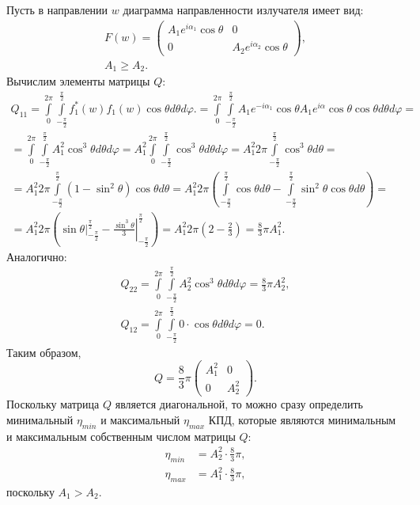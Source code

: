 Пусть в направлении $w$ диаграмма направленности излучателя имеет вид:
\begin{gather*}
    F(w)
    = \begin{pmatrix}
          A_1 e^{i \alpha_1} \cos \theta & 0                              \\
          0                              & A_2 e^{i \alpha_2} \cos \theta
    \end{pmatrix} , \\
    A_1 \ge A_2.
\end{gather*}
Вычислим элементы матрицы $Q$:
\begin{multline*}
    Q_{11}
    = \int \limits_0^{2 \pi} \int \limits_{-\frac{\pi}{2}}^\frac{\pi}{2} f_1^*(w) f_1(w) \cos \theta d\theta d\varphi .
    = \int \limits_0^{2 \pi} \int \limits_{-\frac{\pi}{2}}^\frac{\pi}{2} A_1 e^{-i \alpha_1} \cos \theta A_1 e^{i \alpha} \cos \theta \cos \theta d\theta d\varphi = \\
    = \int \limits_0^{2 \pi} \int \limits_{-\frac{\pi}{2}}^\frac{\pi}{2} A_1^2 \cos^3 \theta d\theta d\varphi
    = A_1^2 \int \limits_0^{2 \pi} \int \limits_{-\frac{\pi}{2}}^\frac{\pi}{2} \cos^3 \theta d\theta d\varphi
    = A_1^2 2 \pi \int \limits_{-\frac{\pi}{2}}^\frac{\pi}{2} \cos^3 \theta d\theta = \\
    = A_1^2 2 \pi \int \limits_{-\frac{\pi}{2}}^\frac{\pi}{2} (1 - \sin^2 \theta ) \cos \theta d\theta
    = A_1^2 2 \pi \left( \int \limits_{-\frac{\pi}{2}}^\frac{\pi}{2} \cos \theta d\theta - \int \limits_{-\frac{\pi}{2}}^\frac{\pi}{2} \sin^2 \theta \cos \theta d\theta \right) = \\
    = A_1^2 2 \pi \left( \left. \sin \theta \right|_{-\frac{\pi}{2}}^\frac{\pi}{2} - \left. \frac{\sin^3 \theta}{3} \right|_{-\frac{\pi}{2}}^\frac{\pi}{2} \right)
    = A_1^2 2 \pi \left( 2 - \frac{2}{3} \right)
    = \frac{8}{3} \pi A_1^2 .
\end{multline*}
Аналогично:
\begin{gather*}
    Q_{22}
    = \int \limits_0^{2 \pi} \int \limits_{-\frac{\pi}{2}}^\frac{\pi}{2} A_2^2 \cos^3 \theta d\theta d\varphi
    = \frac{8}{3} \pi A_2^2 , \\
    Q_{12}
    = \int \limits_0^{2 \pi} \int \limits_{-\frac{\pi}{2}}^\frac{\pi}{2} 0 \cdot \cos \theta d\theta d\varphi
    = 0 .
\end{gather*}
Таким образом,
\[
    Q
    = \frac{8}{3} \pi
    \begin{pmatrix}
        A_1^2 & 0     \\
        0     & A_2^2
    \end{pmatrix} .
\]
Поскольку матрица $Q$ является диагональной, то можно сразу определить минимальный $\eta_{min}$ и максимальный $\eta_{max}$ КПД, которые являются минимальным и максимальным собственным
числом матрицы $Q$:
\begin{align*}
    \eta_{min} & = A_2^2 \cdot \frac{8}{3} \pi , \\
    \eta_{max} & = A_1^2 \cdot \frac{8}{3} \pi ,
\end{align*}
поскольку $A_1 > A_2$.

